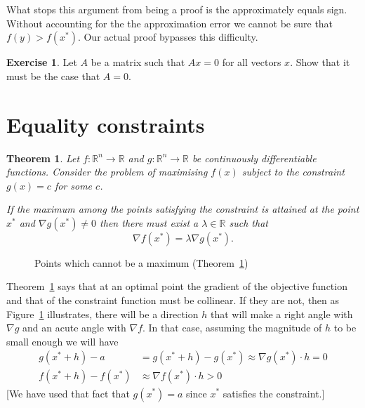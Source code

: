 \documentclass[11pt,reqno,openany]{amsbook}
\numberwithin{figure}{chapter}
\numberwithin{equation}{chapter}
\theoremstyle{plain}
\newtheorem{thm}{Theorem}[chapter]
\theoremstyle{definition}
\newtheorem{xca}{Exercise}[chapter]
\newcommand{\dotprod}[2]{{#1}\cdot{#2}}
\renewcommand{\Re}{\mathbb{R}}
\begin{document}
What stops this argument from being a proof is the
approximately equals sign. Without accounting for the the
approximation error we cannot be sure that
$f(y)>f(x^*)$. Our actual proof bypasses this difficulty.

\begin{xca}
  Let $A$ be a matrix such that $Ax=0$ for all vectors
  $x$. Show that it must be the case that $A=0$.
\end{xca}

\section{Equality constraints}
\begin{thm}\label{thm:equality:foc}
Let $f\colon\Re^n \to \Re$ and $g\colon \Re^n \to \Re$ be
continuously differentiable functions. Consider the problem
of maximising $f(x)$ subject to the constraint $g(x)=c$ for
some $c$.

If the maximum among the points satisfying the constraint is
attained at the point $x^*$ and $\nabla g(x^*) \ne 0$ then
there must exist a $\lambda \in \Re$ such that
\[\nabla f(x^*) =\lambda \nabla g(x^*).\]
\end{thm}

\begin{figure}
  \caption{Points which cannot be a maximum (Theorem~\ref{thm:equality:foc})}
  \label{fig:equality:foc}
\end{figure}

Theorem~\ref{thm:equality:foc} says that at an optimal point
the gradient of the objective function and that of the
constraint function must be collinear. If they are not, then
as Figure~\ref{fig:equality:foc} illustrates, there will be
a direction $h$ that will make a right angle with $\nabla g$ and
an acute angle with $\nabla f$. In that case, assuming the
magnitude of $h$ to be small enough we will have
\begin{align*}
  g(x^*+h)- a &= g(x^*+h)-g(x^*) \approx \dotprod{\nabla
    g(x^*)}{h} = 0\\
  f(x^*+h)-f(x^*) &\approx \dotprod{\nabla f(x^*)}{h} > 0
\end{align*}
[We have used that fact that $g(x^*)=a$ since $x^*$
satisfies the constraint.]
\end{document}
